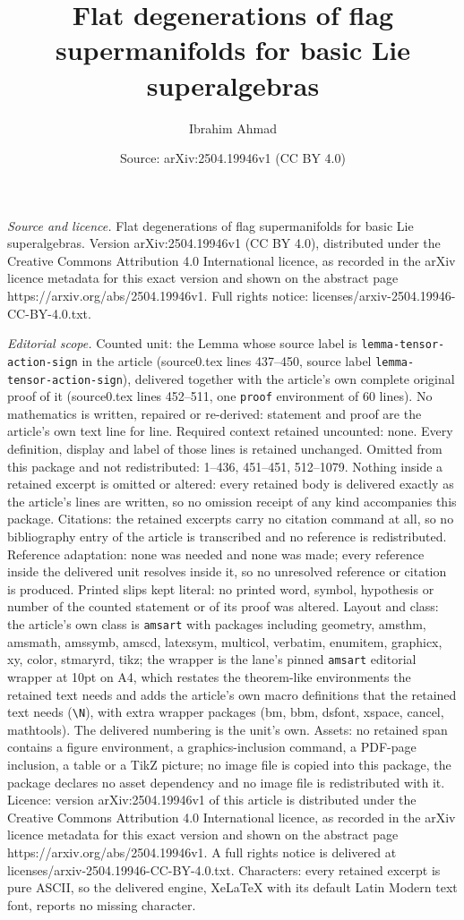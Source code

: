 \documentclass[10pt,a4paper]{amsart}
\title[Flat degenerations of flag supermanifolds for basic Lie supe]{Flat degenerations of flag supermanifolds for basic Lie superalgebras}
\author{Ibrahim Ahmad}
\date{Source: arXiv:2504.19946v1 (CC BY 4.0)}
\begin{document}
\maketitle

\noindent\emph{Source and licence.} Flat degenerations of flag supermanifolds for basic Lie superalgebras. Version arXiv:2504.19946v1 (CC BY 4.0), distributed under the Creative Commons Attribution 4.0 International licence, as recorded in the arXiv licence metadata for this exact version and shown on the abstract page https://arxiv.org/abs/2504.19946v1. Full rights notice: licenses/arxiv-2504.19946-CC-BY-4.0.txt.\par\smallskip

\noindent\textit{Editorial scope.} Counted unit: the Lemma whose source label is \texttt{lemma-tensor-action-sign} in the article (source0.tex lines 437--450, source label \texttt{lemma-tensor-action-sign}), delivered together with the article's own complete original proof of it (source0.tex lines 452--511, one \texttt{proof} environment of 60 lines). No mathematics is written, repaired or re-derived: statement and proof are the article's own text line for line. Required context retained uncounted: none. Every definition, display and label of those lines is retained unchanged. Omitted from this package and not redistributed: 1--436, 451--451, 512--1079. Nothing inside a retained excerpt is omitted or altered: every retained body is delivered exactly as the article's lines are written, so no omission receipt of any kind accompanies this package. Citations: the retained excerpts carry no citation command at all, so no bibliography entry of the article is transcribed and no reference is redistributed. Reference adaptation: none was needed and none was made; every reference inside the delivered unit resolves inside it, so no unresolved reference or citation is produced. Printed slips kept literal: no printed word, symbol, hypothesis or number of the counted statement or of its proof was altered. Layout and class: the article's own class is \texttt{amsart} with packages including geometry, amsthm, amsmath, amssymb, amscd, latexsym, multicol, verbatim, enumitem, graphicx, xy, color, stmaryrd, tikz; the wrapper is the lane's pinned \texttt{amsart} editorial wrapper at 10pt on A4, which restates the theorem-like environments the retained text needs and adds the article's own macro definitions that the retained text needs (\texttt{\textbackslash N}), with extra wrapper packages (bm, bbm, dsfont, xspace, cancel, mathtools). The delivered numbering is the unit's own. Assets: no retained span contains a figure environment, a graphics-inclusion command, a PDF-page inclusion, a table or a TikZ picture; no image file is copied into this package, the package declares no asset dependency and no image file is redistributed with it. Licence: version arXiv:2504.19946v1 of this article is distributed under the Creative Commons Attribution 4.0 International licence, as recorded in the arXiv licence metadata for this exact version and shown on the abstract page https://arxiv.org/abs/2504.19946v1. A full rights notice is delivered at licenses/arxiv-2504.19946-CC-BY-4.0.txt. Characters: every retained excerpt is pure ASCII, so the delivered engine, XeLaTeX with its default Latin Modern text font, reports no missing character.
\end{document}

